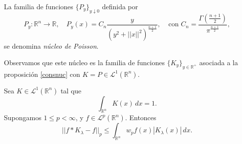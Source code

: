 \begin{ejemplo}
    La familia de funciones $\{P_y\}_{y\downarrow
0}$ definida por
    \begin{equation}
        P_{y}: \mathbb{R}^n \rightarrow \mathbb{R}, \; \; \; \, P_{y}(x) = C_n \frac{y}{(y^2 + ||x||^2)^{\frac{n+1}{2}}}, \; \; \; \; \text{con} \, \, C_n = \frac{\Gamma({\frac{n+1}{2}})}{\pi^{\frac{n+1}{2}}},
    \end{equation}
    se denomina \textit{núcleo de Poisson}.

    \noindent Observamos que este núcleo es la familia de funciones $\{K_{y}\}_{y \in \mathbb{R}^+}$ asociada a la proposición \ref{consnuc} con $K = P \in \mathscr{L}^1(\mathbb{R}^n)$.
\end{ejemplo}

\begin{lema}\label{lema:previo}
    Sea $K  \in \mathscr{L}^1(\mathbb{R}^n)$ tal que 
\begin{equation}
    \int_{\mathbb{R}^n}K(x) \, dx = 1.
\end{equation}
Supongamos $1 \leq p < \infty$, y $f \in \mathscr{L}^p(\mathbb{R}^n)$. Entonces
\begin{equation}
|| f*K_{\lambda}-f||_p \leq \int_{\mathbb{R}^n} w_pf(x) |K_{\lambda}(x)| \, dx.
\end{equation}
\end{lema}
